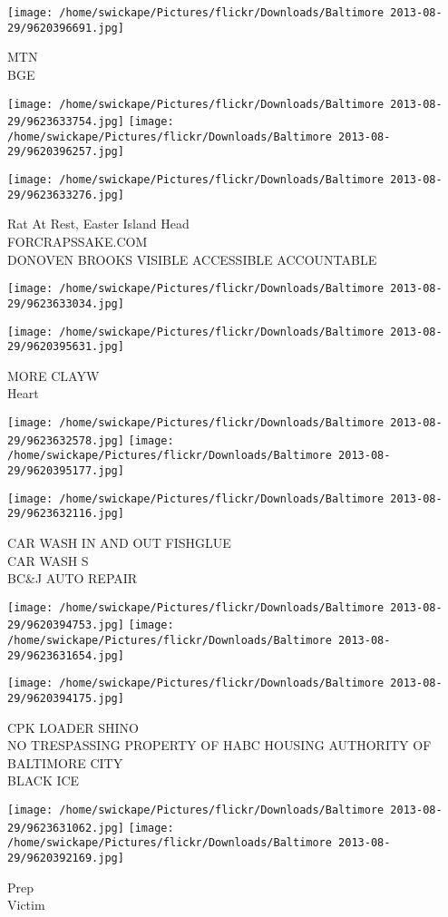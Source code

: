 \documentclass[10pt,letterpaper]{article}
\begin{document}
\vspace{0.25in}
\texttt{[image: /home/swickape/Pictures/flickr/Downloads/Baltimore 2013-08-29/9620396691.jpg]}

MTN\\
BGE
\pagebreak

\texttt{[image: /home/swickape/Pictures/flickr/Downloads/Baltimore 2013-08-29/9623633754.jpg]}
\texttt{[image: /home/swickape/Pictures/flickr/Downloads/Baltimore 2013-08-29/9620396257.jpg]}

\texttt{[image: /home/swickape/Pictures/flickr/Downloads/Baltimore 2013-08-29/9623633276.jpg]}

Rat At Rest, Easter Island Head\\
FORCRAPSSAKE.COM\\
DONOVEN BROOKS VISIBLE ACCESSIBLE ACCOUNTABLE
\pagebreak

\texttt{[image: /home/swickape/Pictures/flickr/Downloads/Baltimore 2013-08-29/9623633034.jpg]}

\vspace{0.25in}
\texttt{[image: /home/swickape/Pictures/flickr/Downloads/Baltimore 2013-08-29/9620395631.jpg]}

MORE CLAYW\\
Heart
\pagebreak

\texttt{[image: /home/swickape/Pictures/flickr/Downloads/Baltimore 2013-08-29/9623632578.jpg]}
\texttt{[image: /home/swickape/Pictures/flickr/Downloads/Baltimore 2013-08-29/9620395177.jpg]}

\vspace{0.25in}
\texttt{[image: /home/swickape/Pictures/flickr/Downloads/Baltimore 2013-08-29/9623632116.jpg]}

CAR WASH IN AND OUT FISHGLUE\\
CAR WASH S\\
BC\&J AUTO REPAIR
\pagebreak

\texttt{[image: /home/swickape/Pictures/flickr/Downloads/Baltimore 2013-08-29/9620394753.jpg]}
\texttt{[image: /home/swickape/Pictures/flickr/Downloads/Baltimore 2013-08-29/9623631654.jpg]}

\vspace{0.25in}
\texttt{[image: /home/swickape/Pictures/flickr/Downloads/Baltimore 2013-08-29/9620394175.jpg]}

CPK LOADER SHINO\\
NO TRESPASSING PROPERTY OF HABC HOUSING AUTHORITY OF BALTIMORE CITY\\
BLACK ICE
\pagebreak

\texttt{[image: /home/swickape/Pictures/flickr/Downloads/Baltimore 2013-08-29/9623631062.jpg]}
\texttt{[image: /home/swickape/Pictures/flickr/Downloads/Baltimore 2013-08-29/9620392169.jpg]}

Prep\\
Victim
\pagebreak
\end{document}
